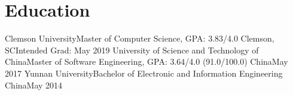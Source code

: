 
\section{Education}
  \subItemListStart
    \educationSubItem
      {Clemson University}{Master of Computer Science, GPA: 3.83/4.0}
    {Clemson, SC}{Intended Grad: May 2019}
    \educationSubItem
      {University of Science and Technology of China}{Master of Software Engineering, GPA: 3.64/4.0 (91.0/100.0)}
      {China}{May 2017}
    \educationSubItem
      {Yunnan University}{Bachelor of Electronic and Information Engineering}
      {China}{May 2014}
  \subItemListEnd